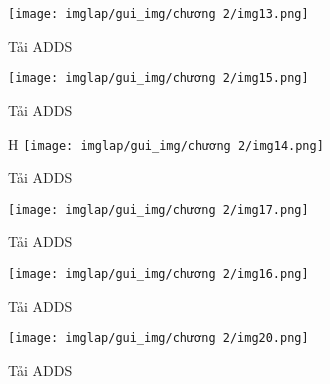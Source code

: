 \documentclass[13pt]{article}
\begin{document}
\begin{itemize}
\begin{itemize}
                            \begin{figure}[H]
                                \centering
                                \texttt{[image: imglap/gui\_img/chương 2/img13.png]}
                                \caption{Tải ADDS}
                                \label{fig:enter-label}
                            \end{figure}

                            \begin{figure}[H]
                                \centering
                                \texttt{[image: imglap/gui\_img/chương 2/img15.png]}
                                \caption{Tải ADDS}
                                \label{fig:enter-label}
                            \end{figure}

                            \begin{figure}{H}
                                \centering
                                \texttt{[image: imglap/gui\_img/chương 2/img14.png]}
                                \caption{Tải ADDS}
                                \label{fig:enter-label}
                            \end{figure}

                            \begin{figure}[H]
                                \centering
                                \texttt{[image: imglap/gui\_img/chương 2/img17.png]}
                                \caption{Tải ADDS}
                                \label{fig:enter-label}
                            \end{figure}

                            \begin{figure}[H]
                                \centering
                                \texttt{[image: imglap/gui\_img/chương 2/img16.png]}
                                \caption{Tải ADDS}
                                \label{fig:enter-label}
                            \end{figure}

                            \begin{figure}
                                \centering
                                \texttt{[image: imglap/gui\_img/chương 2/img20.png]}
                                \caption{Tải ADDS}
                                \label{fig:enter-label}
                            \end{figure}


\end{itemize}
\end{itemize}
\end{document}
